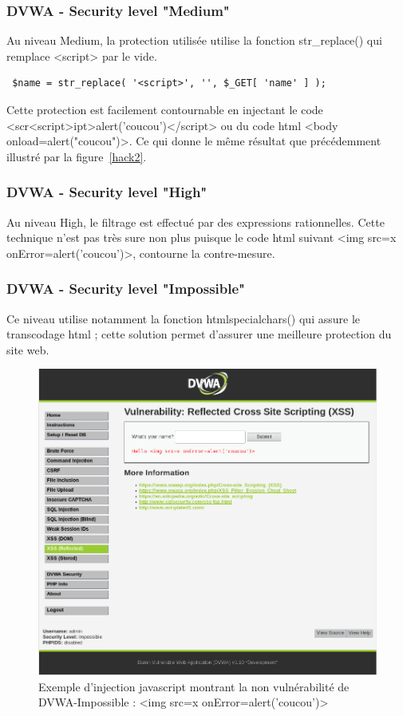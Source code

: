 \subsubsection{DVWA - Security level "Medium"}
Au niveau Medium, la protection utilisée utilise la fonction  str\_replace()
qui remplace <script> par le vide.  
\begin{verbatim}
 $name = str_replace( '<script>', '', $_GET[ 'name' ] ); 
\end{verbatim}
Cette protection est facilement contournable en injectant le code
<scr<script>ipt>alert('coucou')</script> ou du code html <body onload=alert("coucou")>. Ce qui donne le même résultat
que précédemment illustré par la figure~\ref{hack2}. 

\subsubsection{DVWA - Security level "High"}

Au niveau High, le filtrage est effectué par des expressions rationnelles.
Cette technique n'est pas très sure non plus puisque le code html suivant
<img src=x onError=alert('coucou')>, contourne la contre-mesure.


\subsubsection{DVWA - Security level "Impossible"}

Ce niveau utilise notamment la fonction htmlspecialchars() qui assure le transcodage html ; cette solution permet d'assurer une meilleure protection du site web.
\begin{figure}[H]
	\begin{center}
		\includegraphics[scale=\scaledvwa]{images/xss/hack3.png}
		\caption{Exemple d'injection javascript montrant la non vulnérabilité de DVWA-Impossible : <img src=x onError=alert('coucou')>} 
		\label{hack3}
	\end{center}
\end{figure}

